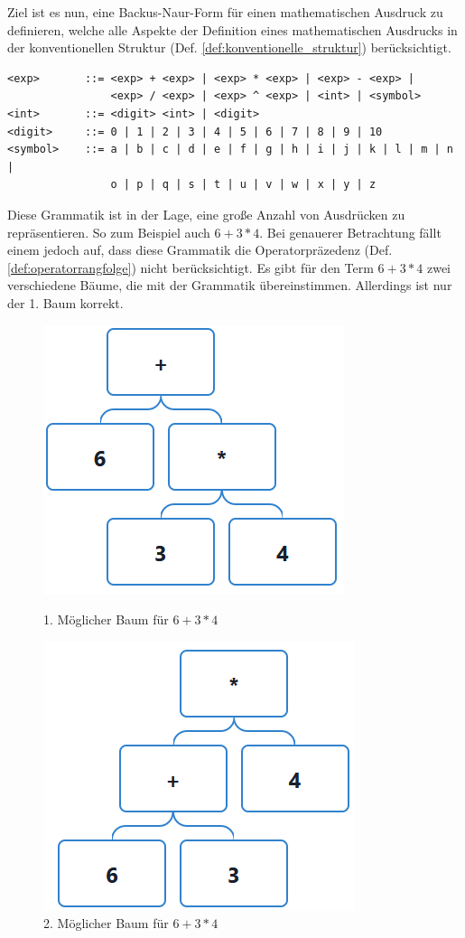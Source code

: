 \documentclass[11pt]{article}
\newcommand{\lab}[1]{(Def. \ref{#1})}
\begin{document}
Ziel ist es nun, eine Backus-Naur-Form für einen mathematischen Ausdruck 
zu definieren, welche alle Aspekte der Definition 
eines mathematischen Ausdrucks in der konventionellen Struktur 
\lab{def:konventionelle_struktur} berücksichtigt.

\begin{verbatim}
<exp>       ::= <exp> + <exp> | <exp> * <exp> | <exp> - <exp> | 
                <exp> / <exp> | <exp> ^ <exp> | <int> | <symbol>
<int>       ::= <digit> <int> | <digit>
<digit>     ::= 0 | 1 | 2 | 3 | 4 | 5 | 6 | 7 | 8 | 9 | 10
<symbol>    ::= a | b | c | d | e | f | g | h | i | j | k | l | m | n | 
                o | p | q | s | t | u | v | w | x | y | z
\end{verbatim}

Diese Grammatik ist in der Lage, eine große Anzahl von Ausdrücken zu repräsentieren. 
So zum Beispiel auch $6+3*4$. Bei genauerer Betrachtung fällt einem jedoch auf, 
dass diese Grammatik die Operatorpräzedenz \lab{def:operatorrangfolge} 
nicht berücksichtigt. 
Es gibt für den Term $6+3*4$ zwei verschiedene Bäume, 
die mit der Grammatik übereinstimmen. 
Allerdings ist nur der 1. Baum korrekt. 

\begin{figure}[h]
\begin{minipage}{.5\textwidth}
  \centering
  \includegraphics[scale=0.5]{trees/beispiel_bnf_2_1.png}
  \caption{1. Möglicher Baum für $6+3*4$}
\end{minipage}
\begin{minipage}{.5\textwidth}
  \centering
  \includegraphics[scale=0.5]{trees/beispiel_bnf_2_2.png}
  \caption{2. Möglicher Baum für $6+3*4$}
\end{minipage}
\end{figure}
\end{document}
